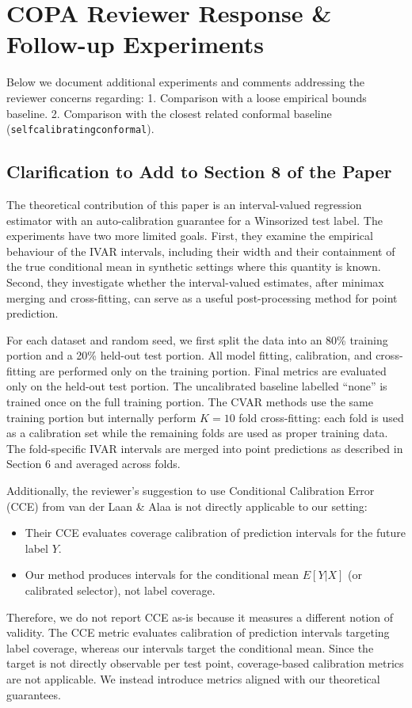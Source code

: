 \documentclass{article}
\begin{document}
\section{COPA Reviewer Response \& Follow-up Experiments}

Below we document additional experiments and comments addressing the reviewer concerns regarding:
1. Comparison with a loose empirical bounds baseline.
2. Comparison with the closest related conformal baseline (\texttt{selfcalibratingconformal}).

\subsection{Clarification to Add to Section 8 of the Paper}

The theoretical contribution of this paper is an interval-valued regression estimator with an auto-calibration guarantee for a Winsorized test label. The experiments have two more limited goals. First, they examine the empirical behaviour of the IVAR intervals, including their width and their containment of the true conditional mean in synthetic settings where this quantity is known. Second, they investigate whether the interval-valued estimates, after minimax merging and cross-fitting, can serve as a useful post-processing method for point prediction.

For each dataset and random seed, we first split the data into an 80\% training portion and a 20\% held-out test portion. All model fitting, calibration, and cross-fitting are performed only on the training portion. Final metrics are evaluated only on the held-out test portion. The uncalibrated baseline labelled ``none'' is trained once on the full training portion. The CVAR methods use the same training portion but internally perform $K = 10$ fold cross-fitting: each fold is used as a calibration set while the remaining folds are used as proper training data. The fold-specific IVAR intervals are merged into point predictions as described in Section 6 and averaged across folds.

Additionally, the reviewer's suggestion to use Conditional Calibration Error (CCE) from van der Laan \& Alaa is not directly applicable to our setting:
\begin{itemize}
    \item Their CCE evaluates coverage calibration of prediction intervals for the future label $Y$.
    \item Our method produces intervals for the conditional mean $E[Y|X]$ (or calibrated selector), not label coverage.
\end{itemize}
Therefore, we do not report CCE as-is because it measures a different notion of validity. The CCE metric evaluates calibration of prediction intervals targeting label coverage, whereas our intervals target the conditional mean. Since the target is not directly observable per test point, coverage-based calibration metrics are not applicable. We instead introduce metrics aligned with our theoretical guarantees.
\end{document}
